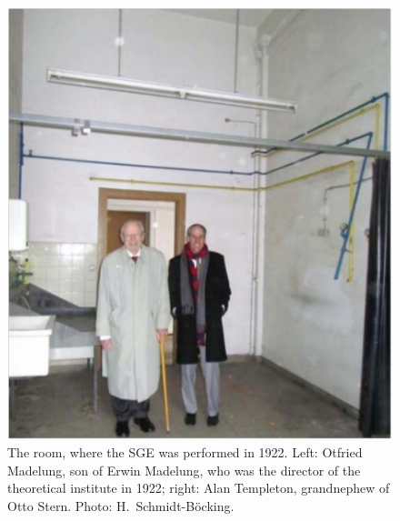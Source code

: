 \documentclass[12pt]{article}
\begin{document}
%
\begin{figure}
\begin{center}
\includegraphics[scale=0.45]{figures/SGE_room}
\caption{The room, where the SGE was performed in 1922. Left: Otfried Madelung, son of Erwin Madelung, who was the director of the theoretical institute in 1922; right: Alan Templeton, grandnephew of Otto Stern. Photo: H.~Schmidt-B\"ocking.}
\label{fig:SGEroom}
\end{center}
\end{figure}
\end{document}
